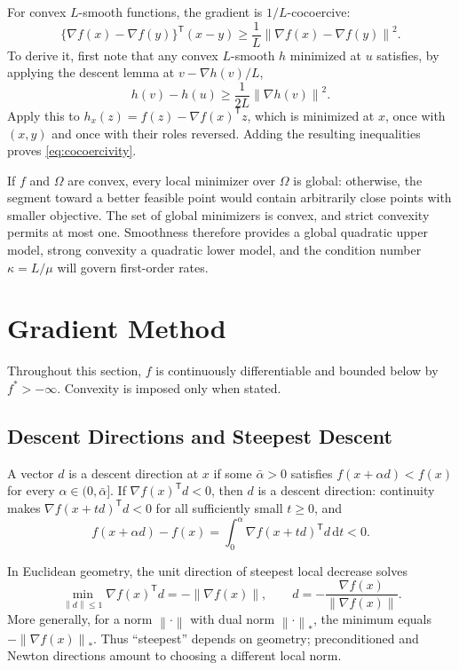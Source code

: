 \documentclass[12pt,oneside]{book}
\numberwithin{equation}{section}
\theoremstyle{definition}
\theoremstyle{plain}
\theoremstyle{remark}
\newcommand{\norm}[1]{\left\lVert #1 \right\rVert}
\newcommand{\dd}{\,\mathrm{d}}
\newcommand{\grad}{\nabla}
\begin{document}
For convex $L$-smooth functions, the gradient is $1/L$-cocoercive:
\begin{equation}
 \{\grad f(x)-\grad f(y)\}^\mathsf T(x-y)
 \geq\frac1L\norm{\grad f(x)-\grad f(y)}^2.
 \label{eq:cocoercivity}
\end{equation}
To derive it, first note that any convex $L$-smooth $h$ minimized at $u$
satisfies, by applying the descent lemma at $v-\grad h(v)/L$,
\[
 h(v)-h(u)\geq\frac1{2L}\norm{\grad h(v)}^2.
\]
Apply this to $h_x(z)=f(z)-\grad f(x)^\mathsf Tz$, which is minimized at $x$,
once with $(x,y)$ and once with their roles reversed. Adding the resulting
inequalities proves \cref{eq:cocoercivity}.

If $f$ and $\Omega$ are convex, every local minimizer over $\Omega$ is global:
otherwise, the segment toward a better feasible point would contain
arbitrarily close points with smaller objective. The set of global minimizers
is convex, and strict convexity permits at most one. Smoothness therefore
provides a global quadratic upper model, strong convexity a quadratic lower
model, and the condition number $\kappa=L/\mu$ will govern first-order rates.

\section{Gradient Method}

Throughout this section, $f$ is continuously differentiable and bounded below
by $f^*>-\infty$. Convexity is imposed only when stated.

\subsection{Descent Directions and Steepest Descent}

A vector $d$ is a descent direction at $x$ if some $\bar\alpha>0$ satisfies
$f(x+\alpha d)<f(x)$ for every $\alpha\in(0,\bar\alpha]$. If
$\grad f(x)^\mathsf Td<0$, then $d$ is a descent direction: continuity makes
$\grad f(x+td)^\mathsf Td<0$ for all sufficiently small $t\geq0$, and
\[
 f(x+\alpha d)-f(x)
 =\int_0^\alpha\grad f(x+td)^\mathsf Td\dd t<0.
\]

In Euclidean geometry, the unit direction of steepest local decrease solves
\[
 \min_{\norm d\leq1}\grad f(x)^\mathsf Td
 =-\norm{\grad f(x)},
 \qquad
 d=-\frac{\grad f(x)}{\norm{\grad f(x)}}.
\]
More generally, for a norm $\norm{\cdot}$ with dual norm
$\norm{\cdot}_*$, the minimum equals $-\norm{\grad f(x)}_*$. Thus
``steepest'' depends on geometry; preconditioned and Newton directions amount
to choosing a different local norm.
\end{document}
